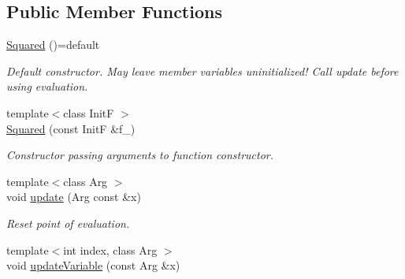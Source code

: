 \subsection*{Public Member Functions}
\begin{DoxyCompactItemize}
\item 
\hypertarget{structFunG_1_1MathematicalOperations_1_1Squared_a9cd7a202bf104def76c3dc4ddbe82a47}{\hyperlink{structFunG_1_1MathematicalOperations_1_1Squared_a9cd7a202bf104def76c3dc4ddbe82a47}{Squared} ()=default}\label{structFunG_1_1MathematicalOperations_1_1Squared_a9cd7a202bf104def76c3dc4ddbe82a47}

\begin{DoxyCompactList}\small\item\em Default constructor. May leave member variables uninitialized! Call update before using evaluation. \end{DoxyCompactList}\item 
{\footnotesize template$<$class Init\-F $>$ }\\\hyperlink{structFunG_1_1MathematicalOperations_1_1Squared_a60dab55accc3957f54b0eafece720b5d}{Squared} (const Init\-F \&f\-\_\-)
\begin{DoxyCompactList}\small\item\em Constructor passing arguments to function constructor. \end{DoxyCompactList}\item 
\hypertarget{structFunG_1_1MathematicalOperations_1_1Squared_abea95d90dc29ac105c43f4eadde84cab}{{\footnotesize template$<$class Arg $>$ }\\void \hyperlink{structFunG_1_1MathematicalOperations_1_1Squared_abea95d90dc29ac105c43f4eadde84cab}{update} (Arg const \&x)}\label{structFunG_1_1MathematicalOperations_1_1Squared_abea95d90dc29ac105c43f4eadde84cab}

\begin{DoxyCompactList}\small\item\em Reset point of evaluation. \end{DoxyCompactList}\item 
\hypertarget{structFunG_1_1MathematicalOperations_1_1Squared_aed9b2c4a562bf0349044c9f79dcae078}{{\footnotesize template$<$int index, class Arg $>$ }\\void \hyperlink{structFunG_1_1MathematicalOperations_1_1Squared_aed9b2c4a562bf0349044c9f79dcae078}{update\-Variable} (const Arg \&x)}\label{structFunG_1_1MathematicalOperations_1_1Squared_aed9b2c4a562bf0349044c9f79dcae078}


\end{DoxyCompactItemize}

